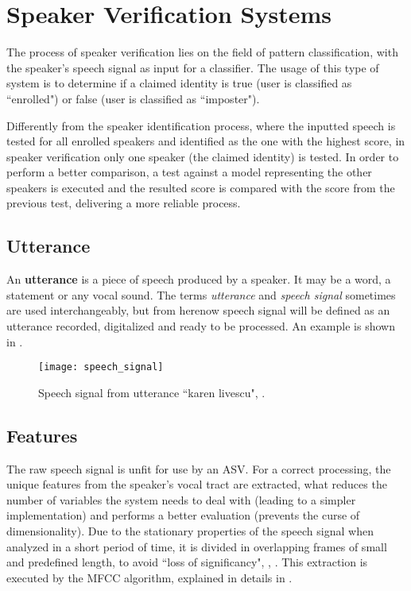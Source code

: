 \chapter{Speaker Verification Systems}
\label{ch:speaker-verification-systems}


The process of speaker verification lies on the field of pattern classification, with the speaker's speech signal as input for a classifier. The usage of this type of system is to determine if a claimed identity is true (user is classified as ``enrolled") or false (user is classified as ``imposter").

Differently from the speaker identification process, where the inputted speech is tested for all enrolled speakers and identified as the one with the highest score, in speaker verification only one speaker (the claimed identity) is tested. In order to perform a better comparison, a test against a model representing the other speakers is executed and the resulted score is compared with the score from the previous test, delivering a more reliable process.

\section{Utterance}

An \textbf{utterance} is a piece of speech produced by a speaker. It may be a word, a statement or any vocal sound. The terms \emph{utterance} and \emph{speech signal} sometimes are used interchangeably, but from herenow speech signal will be defined as an utterance recorded, digitalized and ready to be processed. An example is shown in .

\begin{figure}[ht]
    \centering
    \texttt{[image: speech\_signal]}
    \caption{Speech signal from utterance ``karen livescu", .}
    \label{fig:speech_signal}
\end{figure}

\section{Features}

The raw speech signal is unfit for use by an ASV. For a correct processing, the unique features from the speaker's vocal tract are extracted, what reduces the number of variables the system needs to deal with (leading to a simpler implementation) and performs a better evaluation (prevents the curse of dimensionality). Due to the stationary properties of the speech signal when analyzed in a short period of time, it is divided in overlapping frames of small and predefined length, to avoid ``loss of significancy", , . This extraction is executed by the MFCC algorithm, explained in details in .

